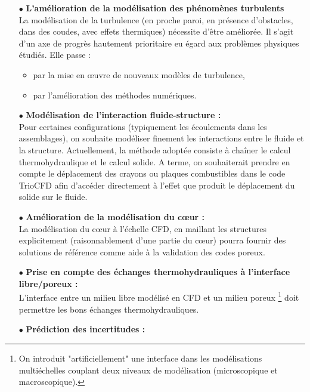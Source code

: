 \begin{itemize}
\item[$\bullet$]
{\bf{L'am\'elioration de la mod\'elisation des ph\'enom\`enes  turbulents }}\\
La mod\'elisation de la turbulence (en proche paroi, en pr\'esence d'obstacles, dans des coudes, avec effets thermiques) n\'ecessite d'\^etre am\'elior\'ee. Il s'agit d'un axe de progr\`es hautement prioritaire eu \'egard aux probl\`emes physiques \'etudi\'es. Elle passe :
\begin{itemize}
\item
par la mise en {\oe}uvre de nouveaux mod\`eles de turbulence,
\item
par l'am\'elioration des m\'ethodes num\'eriques. \\
\end{itemize}

\item[$\bullet$]
{\bf{Mod\'elisation de l'interaction fluide-structure :}}\\
Pour certaines configurations (typiquement les \'ecoulements dans les assemblages), on souhaite mod\'eliser finement les interactions entre le fluide et la structure.
Actuellement, la m\'ethode adopt\'ee consiste \`a cha\^iner le calcul thermohydraulique et le calcul solide. A terme, on souhaiterait 
prendre en compte le d\'eplacement des crayons ou plaques combustibles dans le code TrioCFD afin d'acc\'eder directement \`a l'effet que produit le d\'eplacement du solide sur le fluide.\\
\item[$\bullet$]
{\bf{Am\'elioration de la mod\'elisation du c{\oe}ur : }}\\
La mod\'elisation du c{\oe}ur \`a l'\'echelle CFD, en maillant les structures explicitement (raisonnablement d'une partie du c{\oe}ur) pourra fournir des solutions de r\'ef\'erence comme aide \`a la validation des codes poreux.\\ 
\item[$\bullet$]
{\bf{Prise en compte des \'echanges thermohydrauliques \`a l'interface libre/poreux : }}\\
L'interface entre un milieu libre mod\'elis\'e en CFD et un milieu poreux \footnote{On introduit "artificiellement" une interface dans les mod\'elisations multi\'echelles couplant deux niveaux de mod\'elisation (microscopique et macroscopique).} doit permettre les bons \'echanges thermohydrauliques.\\
\item[$\bullet$] {\bf{ Pr\'ediction des incertitudes : }}\\

\end{itemize}
